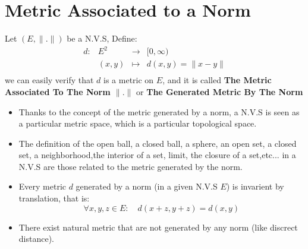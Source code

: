 	\section{Metric Associated to a Norm}
	\begin{definition}[]
		Let $(E, \| . \| )$ be a N.V.S, Define:
		\[
		\begin{array}{cccc}
			d : &  E^{2}  & \longrightarrow & [0, \infty) \\
		
		           &  (x,y)   & \longmapsto     & d(x,y) = \| x-y \|   \\ 
		\end{array}
		\]
		we can easily verify that $d$ is a metric on $E$, and it is called \textbf{The Metric Associated To The Norm $\| . \| $}
		or \textbf{The Generated Metric By The Norm}
	\end{definition}
	\begin{remark}
		\begin{itemize}
		\item Thanks to the concept of the metric generated by a norm, a N.V.S is seen as a particular metric space, which is a
			particular topological space.
		\item The definition of the open ball, a closed ball, a sphere, an open set, a closed set, a neighborhood,the interior 
			of a set, limit, the closure of a set,etc... in a N.V.S are those related to the metric generated by the norm.

		\item Every metric $d$ generated by a norm (in a given N.V.S $E$) is invarient by translation, that is:
			\[
				\forall x,y,z \in E: \quad d(x+z,y+z) = d(x,y)  
			\]
		\item There exist natural metric that are not generated by any norm (like discrect distance).
		\end{itemize}
	\end{remark}

